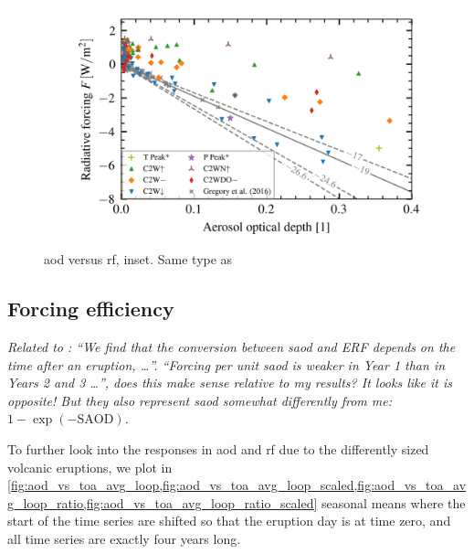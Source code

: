 \documentclass[twocol]{ametsocV5}
\begin{document}
\begin{figure}[t]
  \begin{center}
    \includegraphics[width=0.95\linewidth]{figures/aod_vs_toa_avg_inset.png}
  \end{center}
  \caption{\acrshort{aod} versus \acrshort{rf}, inset. Same type as
    \citet{gregory2016}}%
  \label{fig:aod_vs_toa_inset}
\end{figure}


\subsection{Forcing efficiency}

\emph{Related to \citet{marshall2020}: ``We find that the conversion between
  \acrshort{saod} and ERF depends on the time after an eruption, \dots''. ``Forcing per
  unit \acrshort{saod} is weaker in Year 1 than in Years 2 and 3 \dots'', does this make
  sense relative to my results? It looks like it is opposite! But they also represent
  \acrshort{saod} somewhat differently from me: \( 1-\exp(-\mathrm{SAOD}) \).}

To further look into the responses in \acrshort{aod} and \acrshort{rf} due to the
differently sized volcanic eruptions, we plot in
\cref{fig:aod_vs_toa_avg_loop,fig:aod_vs_toa_avg_loop_scaled,fig:aod_vs_toa_avg_loop_ratio,fig:aod_vs_toa_avg_loop_ratio_scaled}
seasonal means where the start of the time series are shifted so that the eruption day
is at time zero, and all time series are exactly four years long.
\end{document}
